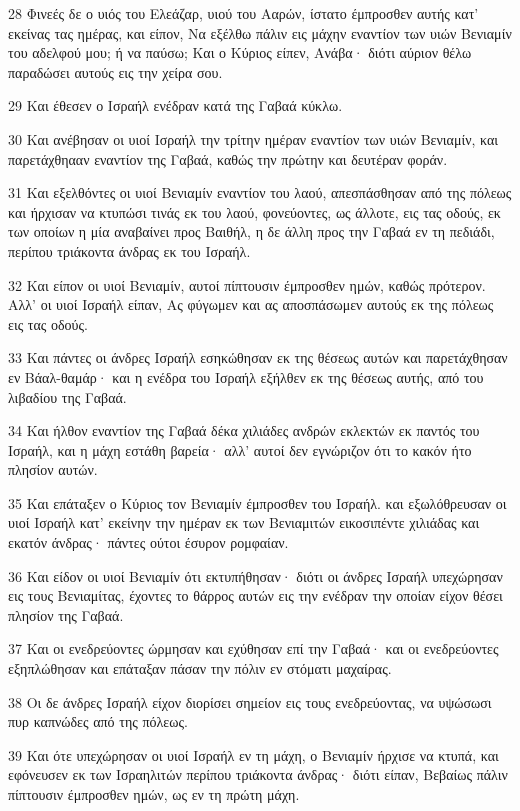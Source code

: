 \par 28 Φινεές δε ο υιός του Ελεάζαρ, υιού του Ααρών, ίστατο έμπροσθεν αυτής κατ' εκείνας τας ημέρας, και είπον, Να εξέλθω πάλιν εις μάχην εναντίον των υιών Βενιαμίν του αδελφού μου; ή να παύσω; Και ο Κύριος είπεν, Ανάβα· διότι αύριον θέλω παραδώσει αυτούς εις την χείρα σου.
\par 29 Και έθεσεν ο Ισραήλ ενέδραν κατά της Γαβαά κύκλω.
\par 30 Και ανέβησαν οι υιοί Ισραήλ την τρίτην ημέραν εναντίον των υιών Βενιαμίν, και παρετάχθηααν εναντίον της Γαβαά, καθώς την πρώτην και δευτέραν φοράν.
\par 31 Και εξελθόντες οι υιοί Βενιαμίν εναντίον του λαού, απεσπάσθησαν από της πόλεως και ήρχισαν να κτυπώσι τινάς εκ του λαού, φονεύοντες, ως άλλοτε, εις τας οδούς, εκ των οποίων η μία αναβαίνει προς Βαιθήλ, η δε άλλη προς την Γαβαά εν τη πεδιάδι, περίπου τριάκοντα άνδρας εκ του Ισραήλ.
\par 32 Και είπον οι υιοί Βενιαμίν, αυτοί πίπτουσιν έμπροσθεν ημών, καθώς πρότερον. Αλλ' οι υιοί Ισραήλ είπαν, Ας φύγωμεν και ας αποσπάσωμεν αυτούς εκ της πόλεως εις τας οδούς.
\par 33 Και πάντες οι άνδρες Ισραήλ εσηκώθησαν εκ της θέσεως αυτών και παρετάχθησαν εν Βάαλ-θαμάρ· και η ενέδρα του Ισραήλ εξήλθεν εκ της θέσεως αυτής, από του λιβαδίου της Γαβαά.
\par 34 Και ήλθον εναντίον της Γαβαά δέκα χιλιάδες ανδρών εκλεκτών εκ παντός του Ισραήλ, και η μάχη εστάθη βαρεία· αλλ' αυτοί δεν εγνώριζον ότι το κακόν ήτο πλησίον αυτών.
\par 35 Και επάταξεν ο Κύριος τον Βενιαμίν έμπροσθεν του Ισραήλ. και εξωλόθρευσαν οι υιοί Ισραήλ κατ' εκείνην την ημέραν εκ των Βενιαμιτών εικοσιπέντε χιλιάδας και εκατόν άνδρας· πάντες ούτοι έσυρον ρομφαίαν.
\par 36 Και είδον οι υιοί Βενιαμίν ότι εκτυπήθησαν· διότι οι άνδρες Ισραήλ υπεχώρησαν εις τους Βενιαμίτας, έχοντες το θάρρος αυτών εις την ενέδραν την οποίαν είχον θέσει πλησίον της Γαβαά.
\par 37 Και οι ενεδρεύοντες ώρμησαν και εχύθησαν επί την Γαβαά· και οι ενεδρεύοντες εξηπλώθησαν και επάταξαν πάσαν την πόλιν εν στόματι μαχαίρας.
\par 38 Οι δε άνδρες Ισραήλ είχον διορίσει σημείον εις τους ενεδρεύοντας, να υψώσωσι πυρ καπνώδες από της πόλεως.
\par 39 Και ότε υπεχώρησαν οι υιοί Ισραήλ εν τη μάχη, ο Βενιαμίν ήρχισε να κτυπά, και εφόνευσεν εκ των Ισραηλιτών περίπου τριάκοντα άνδρας· διότι είπαν, Βεβαίως πάλιν πίπτουσιν έμπροσθεν ημών, ως εν τη πρώτη μάχη.
